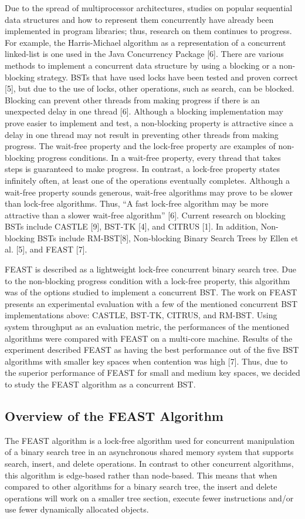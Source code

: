\documentclass[conference]{IEEEtran}
\begin{document}
Due to the spread of multiprocessor architectures, studies on popular sequential data structures and how to represent them concurrently have already been implemented in program libraries; thus, research on them continues to progress. For example, the Harris-Michael algorithm as a representation of a concurrent linked-list is one used in the Java Concurrency Package [6]. There are various methods to implement a concurrent data structure by using a blocking or a non-blocking strategy. BSTs that have used locks have been tested and proven correct [5], but due to the use of locks, other operations, such as search, can be blocked. Blocking can prevent other threads from making progress if there is an unexpected delay in one thread [6]. Although a blocking implementation may prove easier to implement and test, a non-blocking property is attractive since a delay in one thread may not result in preventing other threads from making progress. The wait-free property and the lock-free property are examples of non-blocking progress conditions. In a wait-free property, every thread that takes steps is guaranteed to make progress. In contrast, a lock-free property states infinitely often, at least one of the operations eventually completes. Although a wait-free property sounds generous, wait-free algorithms may prove to be slower than lock-free algorithms. Thus, “A fast lock-free algorithm may be more attractive than a slower wait-free algorithm” [6]. Current research on blocking BSTs include CASTLE [9], BST-TK [4], and CITRUS [1]. In addition, Non-blocking BSTs include RM-BST[8], Non-blocking Binary Search Trees by Ellen et al. [5], and FEAST [7]. 

FEAST is described as a lightweight lock-free concurrent binary search tree. Due to the non-blocking progress condition with a lock-free property, this algorithm was of the options studied to implement a concurrent BST. The work on FEAST presents an experimental evaluation with a few of the mentioned concurrent BST implementations above: CASTLE, BST-TK, CITRUS, and RM-BST. Using system throughput as an evaluation metric, the performances of the mentioned algorithms were compared with FEAST on a multi-core machine. Results of the experiment described FEAST as having the best performance out of the five BST algorithms with smaller key spaces when contention was high [7]. Thus, due to the superior performance of FEAST for small and medium key spaces, we decided to study the FEAST algorithm as a concurrent BST.

\subsection{Overview of the FEAST Algorithm}
The FEAST algorithm is a lock-free algorithm used for concurrent manipulation of a binary search tree in an asynchronous shared memory system that supports search, insert, and delete operations. In contrast to other concurrent algorithms, this algorithm is edge-based rather than node-based. This means that when compared to other algorithms for a binary search tree, the insert and delete operations will work on a smaller tree section, execute fewer instructions and/or use fewer dynamically allocated objects. 
\end{document}
